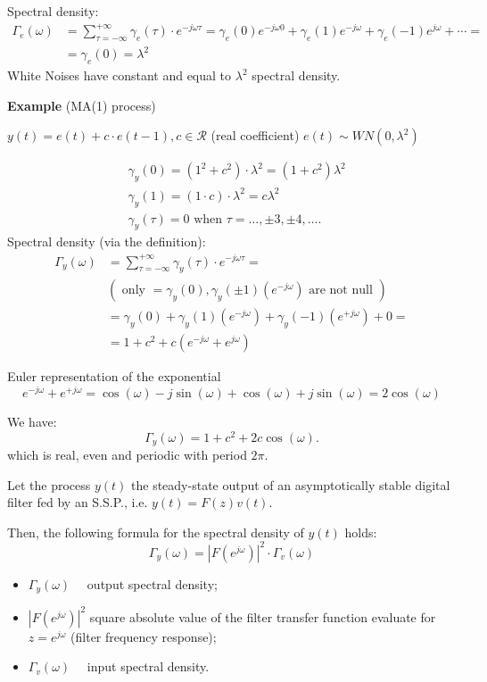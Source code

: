 Spectral density:
$$
\begin{aligned}
	\Gamma_{e}(\omega) &=\sum_{\tau=-\infty}^{+\infty} \gamma_{e}(\tau) \cdot e^{-j \omega \tau}=\gamma_{e}(0) e^{-j \omega 0}+\gamma_{e}(1) e^{-j \omega}+\gamma_{e}(-1) e^{j \omega}+\cdots=\\
	&=\gamma_{e}(0)=\lambda^{2}
\end{aligned}
$$
White Noises have constant and equal to $\lambda^{2}$ spectral density.

\textbf{Example} (MA(1) process)

$y(t)=e(t)+c \cdot e(t-1), c \in \mathcal{R}$ (real coefficient)
$e(t)\sim W N(0,\lambda^{2} )$

\begin{align*}
	&\gamma_{y}(0)=\left(1^{2}+c^{2}\right) \cdot \lambda^{2}=(1+c^{2})\lambda^{2}\\
	&\gamma_{y}(1)=(1 \cdot c) \cdot \lambda^{2}=c\lambda^{2} \\
	&\gamma_{y}(\tau)=0 \text { when } \tau=\ldots, \pm 3, \pm 4, \ldots .
\end{align*}
Spectral density (via the definition):
\begin{align*}
	\Gamma_{y}(\omega)&=\sum_{\tau=-\infty}^{+\infty} \gamma_{y}(\tau) \cdot e^{-j \omega \tau}= \\
	&\left(\text { only }=\gamma_{y}(0), \gamma_{y}(\pm 1)\left(e^{-j \omega}\right) \text { are not null }\right) \\
	&=\gamma_{y}(0)+\gamma_{y}(1)\left(e^{-j \omega}\right)+\gamma_{y}(-1)\left(e^{+j \omega}\right)+0= \\
	&=1+c^{2}+c\left(e^{-j \omega}+e^{j \omega}\right)
\end{align*}

Euler representation of the exponential
$$
e^{-j \omega}+e^{+j \omega}=\cos (\omega)-j \sin (\omega)+\cos (\omega)+j \sin (\omega)=2 \cos (\omega)
$$

We have:
$$\Gamma_y(\omega)=1+c^{2}+2 c \cos (\omega).$$
which is real, even and periodic with period $2 \pi$.

Let the process $y(t)$ the steady-state output of an asymptotically stable digital filter fed by an S.S.P., i.e. $y(t)=F(z) v(t)$.

Then, the following formula for the spectral density of $y(t)$ holds:
$$\Gamma_{y}(\omega)=|F\left(e^{j \omega}\right)|^{2} \cdot \Gamma_{v}(\omega)$$

\begin{itemize}
	\item $\Gamma_{y}(\omega) \quad$ output spectral density;
	\item $\left|F\left(e^{j \omega}\right)\right|^{2}$ square absolute value of the filter transfer function evaluate for $z=e^{j \omega}$ (filter frequency response);
	\item $\Gamma_{v}(\omega) \quad$ input spectral density.
\end{itemize}

